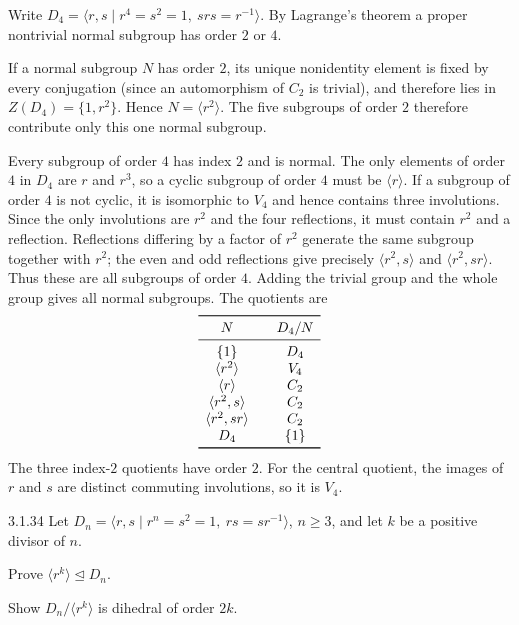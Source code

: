 \documentclass[11pt,oneside]{article}
\begin{document}
\begin{solution}
Write $D_4=\langle r,s\mid r^4=s^2=1,\ srs=r^{-1}\rangle$. By Lagrange's theorem a proper nontrivial normal subgroup has order $2$ or $4$.

If a normal subgroup $N$ has order $2$, its unique nonidentity element is fixed by every conjugation (since an automorphism of $C_2$ is trivial), and therefore lies in $Z(D_4)=\{1,r^2\}$. Hence $N=\langle r^2\rangle$. The five subgroups of order $2$ therefore contribute only this one normal subgroup.

Every subgroup of order $4$ has index $2$ and is normal. The only elements of order $4$ in $D_4$ are $r$ and $r^3$, so a cyclic subgroup of order $4$ must be $\langle r\rangle$. If a subgroup of order $4$ is not cyclic, it is isomorphic to $V_4$ and hence contains three involutions. Since the only involutions are $r^2$ and the four reflections, it must contain $r^2$ and a reflection. Reflections differing by a factor of $r^2$ generate the same subgroup together with $r^2$; the even and odd reflections give precisely $\langle r^2,s\rangle$ and $\langle r^2,sr\rangle$. Thus these are all subgroups of order $4$. Adding the trivial group and the whole group gives all normal subgroups. The quotients are
\[
\begin{array}{c@{\qquad}c}\toprule
N&D_4/N\\\midrule
\{1\}&D_4\\
\langle r^2\rangle&V_4\\
\langle r\rangle&C_2\\
\langle r^2,s\rangle&C_2\\
\langle r^2,sr\rangle&C_2\\
D_4&\{1\}\\\bottomrule\end{array}
\]
The three index-$2$ quotients have order $2$. For the central quotient, the images of $r$ and $s$ are distinct commuting involutions, so it is $V_4$.
\end{solution}

\begin{exercise}{3.1.34}
Let $D_n=\langle r,s\mid r^n=s^2=1,\ rs=sr^{-1}\rangle$, $n\ge3$, and let $k$ be a positive divisor of $n$.
\begin{exercisesubparts}
\item Prove $\langle r^k\rangle\trianglelefteq D_n$.
\item Show $D_n/\langle r^k\rangle$ is dihedral of order $2k$.
\end{exercisesubparts}
\end{exercise}
\end{document}
